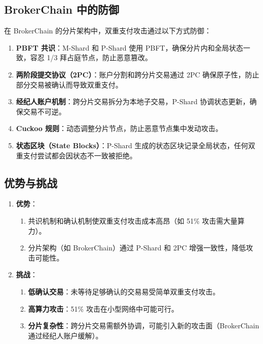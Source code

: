 \documentclass[12pt]{ctexart}
\begin{document}
\subsection{BrokerChain 中的防御}
在 BrokerChain 的分片架构中，双重支付攻击通过以下方式防御：
\begin{enumerate}
    \item \textbf{PBFT 共识}：M-Shard 和 P-Shard 使用 PBFT，确保分片内和全局状态一致，容忍 1/3 拜占庭节点，防止恶意篡改。
    \item \textbf{两阶段提交协议（2PC）}：账户分割和跨分片交易通过 2PC 确保原子性，防止部分交易被确认而导致双重支付。
    \item \textbf{经纪人账户机制}：跨分片交易拆分为本地子交易，P-Shard 协调状态更新，确保交易不可逆。
    \item \textbf{Cuckoo 规则}：动态调整分片节点，防止恶意节点集中发动攻击。
    \item \textbf{状态区块（State Blocks）}：P-Shard 生成的状态区块记录全局状态，任何双重支付尝试都会因状态不一致被拒绝。
\end{enumerate}

\subsection{优势与挑战}
\begin{enumerate}
    \item \textbf{优势}：
        \begin{enumerate}
            \item 共识机制和确认机制使双重支付攻击成本高昂（如 51\% 攻击需大量算力）。
            \item 分片架构（如 BrokerChain）通过 P-Shard 和 2PC 增强一致性，降低攻击可能性。
        \end{enumerate}
    \item \textbf{挑战}：
        \begin{enumerate}
            \item \textbf{低确认交易}：未等待足够确认的交易易受简单双重支付攻击。
            \item \textbf{高算力攻击}：51\% 攻击在小型网络中可能可行。
            \item \textbf{分片复杂性}：跨分片交易需额外协调，可能引入新的攻击面（BrokerChain 通过经纪人账户缓解）。
        \end{enumerate}
\end{enumerate}
\end{document}
